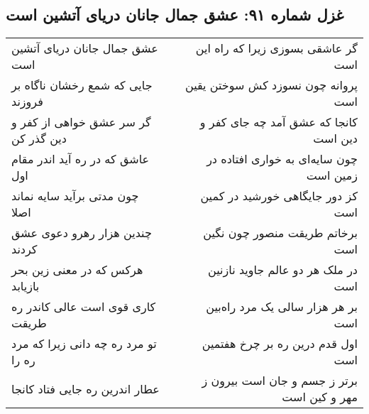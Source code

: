 \begin{center}
\section*{غزل شماره ۹۱: عشق جمال جانان دریای آتشین است}
\label{sec:091}
\begin{longtable}{l p{0.5cm} r}
عشق جمال جانان دریای آتشین است
&&
گر عاشقی بسوزی زیرا که راه این است
\\
جایی که شمع رخشان ناگاه بر فروزند
&&
پروانه چون نسوزد کش سوختن یقین است
\\
گر سر عشق خواهی از کفر و دین گذر کن
&&
کانجا که عشق آمد چه جای کفر و دین است
\\
عاشق که در ره آید اندر مقام اول
&&
چون سایه‌ای به خواری افتاده در زمین است
\\
چون مدتی برآید سایه نماند اصلا
&&
کز دور جایگاهی خورشید در کمین است
\\
چندین هزار رهرو دعوی عشق کردند
&&
برخاتم طریقت منصور چون نگین است
\\
هرکس که در معنی زین بحر بازیابد
&&
در ملک هر دو عالم جاوید نازنین است
\\
کاری قوی است عالی کاندر ره طریقت
&&
بر هر هزار سالی یک مرد راه‌بین است
\\
تو مرد ره چه دانی زیرا که مرد ره را
&&
اول قدم درین ره بر چرخ هفتمین است
\\
عطار اندرین ره جایی فتاد کانجا
&&
برتر ز جسم و جان است بیرون ز مهر و کین است
\\
\end{longtable}
\end{center}
